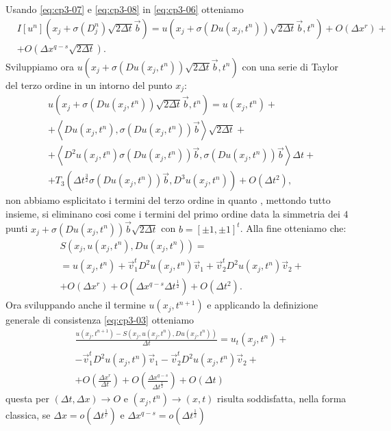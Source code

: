 Usando \eqref{eq:cp3-07} e \eqref{eq:cp3-08} in \eqref{eq:cp3-06} otteniamo
\[
\begin{split}
&I[u^n](x_j+\sigma(D_j^n)\sqrt{2\Delta t}\vec{b})=u(x_j+\sigma(Du(x_j,t^n))\sqrt{2\Delta t}\vec{b},t^n)+O(\Delta x^r)+ \\
& +O(\Delta x^{q-s}\sqrt{2\Delta t}).
\end{split}
\]
Sviluppiamo ora $u(x_j+\sigma(Du(x_j,t^n))\sqrt{2\Delta t}\vec{b},t^n)$ con una serie di Taylor del terzo ordine in un intorno del punto $x_j$:
\begin{equation}
\label{eq:cp3-09}
\begin{split}
&u(x_j+\sigma(Du(x_j,t^n))\sqrt{2\Delta t}\vec{b},t^n) = u(x_j,t^n)+ \\
&+\left<Du(x_j,t^n),\sigma(Du(x_j,t^n))\vec{b}\right>\sqrt{2\Delta t} +\\
&+\left<D^2u(x_j,t^n)\sigma(Du(x_j,t^n))\vec{b},\sigma(Du(x_j,t^n))\vec{b}\right>\Delta t + \\
&+T_3(\Delta t^{\frac{3}{2}}\sigma(Du(x_j,t^n))\vec{b},D^3u(x_j,t^n))+O(\Delta t^2), 
\end{split}
\end{equation}
non abbiamo esplicitato i termini del terzo ordine in quanto , mettondo tutto insieme, si eliminano cosi come i termini del primo ordine data la simmetria dei $4$ punti $x_j+\sigma(Du(x_j,t^n))\vec{b}\sqrt{2\Delta t}$ con $b=[\pm 1,\pm 1]^t$. Alla fine otteniamo che:
\begin{equation}
\label{eq:cp3-010}
\begin{split}
& S(x_j,u(x_j,t^n),Du(x_j,t^n)) = \\
& = u(x_j,t^n) + \vec{v}_1^tD^2u(x_j,t^n)\vec{v}_1 + \vec{v}_2^tD^2u(x_j,t^n)\vec{v}_2 + \\
& + O(\Delta x^r) + O(\Delta x^{q-s}\Delta t^{\frac{1}{2}}) + O(\Delta t^2).
\end{split}
\end{equation}
Ora sviluppando  anche il termine $u(x_j,t^{n+1})$ e applicando la definizione generale di consistenza \eqref{eq:cp3-03} otteniamo 
\[
\begin{split}
&\frac{u(x_j,t^{n+1})-S(x_j,u(x_j,t^n),Du(x_j,t^n))}{\Delta t}= u_t(x_j,t^n) + \\
&  -\vec{v}_1^tD^2u(x_j,t^n)\vec{v}_1 -\vec{v}_2^tD^2u(x_j,t^n)\vec{v}_2 + \\
& +O(\frac{\Delta x^r}{\Delta t}) + O(\frac{\Delta x^{q-s}}{\Delta t^{\frac{1}{2}}}) + O(\Delta t)
\end{split}
\]
questa per $(\Delta t,\Delta x)\to O$ e $(x_j,t^n)\to(x,t)$ risulta soddisfatta, nella forma classica, se $\Delta x = o(\Delta t^{\frac{1}{r}})$ e $\Delta x^{q-s}=o(\Delta t^{\frac{1}{2}})$
